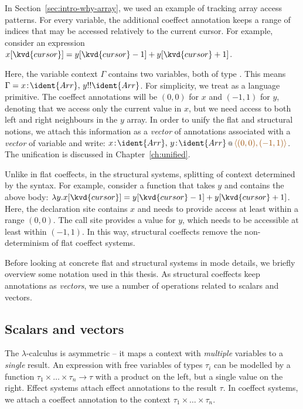 In Section~\ref{sec:intro-why-array}, we used an example of tracking array access patterns. For every
variable, the additional coeffect annotation keeps a range of indices that may be accessed relatively
to the current cursor. For example, consider an expression 
$x[\kvd{cursor}] = y[\kvd{cursor}-1] + y[\kvd{cursor}+1]$.

Here, the variable context $\Gamma$ contains two variables, both of type . This means
$\Gamma = x\!:\!\ident{Arr},\, y\-!\-!\ident{Arr}$. For simplicity, we treat  as a 
language primitive. The coeffect annotations will be $(0,0)$ for $x$ and $(-1,1)$ for $y$, 
denoting that we access only the current value in $x$, but we need access to both left and right 
neighbours in the $y$ array. In order to unify the flat and structural notions, we attach this information 
as a \emph{vector} of annotations associated with a \emph{vector} of variable and write:
$\coctx{x\!:\!\ident{Arr},\, y\!:\!\ident{Arr}}{ \aclrd{\alift{ (0,0), (-1,1) }} }$.
The unification is discussed in Chapter~\ref{ch:unified}.

Unlike in flat coeffects, in the structural systems, splitting of context determined by the syntax. 
For example, consider a function that takes $y$ and contains the above body:
$\lambda y.x[\kvd{cursor}] = y[\kvd{cursor}-1] + y[\kvd{cursor}+1]$. Here, the declaration site
contains $x$ and needs to provide access at least within a range $(0,0)$. The call site provides
a value for $y$, which needs to be accessible at least within $(-1, 1)$. In this way, structural
coeffects remove the non-determinism of flat coeffect systems.

Before looking at concrete flat and structural systems in mode details, we briefly overview 
some notation used in this thesis. As structural coeffects keep annotations as \emph{vectors},
we use a number of operations related to scalars and vectors.


\subsection{Scalars and vectors}

The $\lambda$-calculus is asymmetric -- it maps a context with \emph{multiple} variables to a 
\emph{single} result. An expression with free variables of types $\tau_i$ can be modelled by a function 
$\tau_1 \times \ldots \times \tau_n \rightarrow \tau$ with a product on the left, but a single value
on the right. Effect systems attach effect annotations to the result $\tau$. In coeffect systems,
we attach a coeffect annotation to the context $\tau_1 \times \ldots \times \tau_n$.

